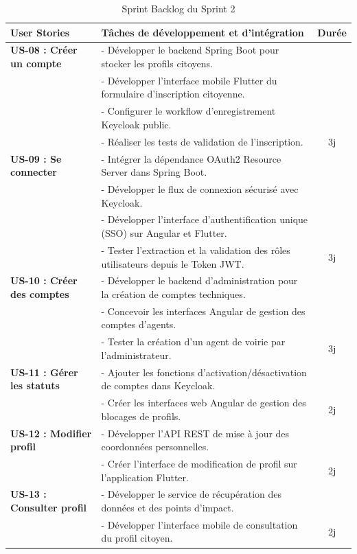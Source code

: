 \begin{table}[H]
    \centering
    \caption{Sprint Backlog du Sprint 2}
    \label{tab:backlog_sprint2}
    \vspace{0.2cm}
    \scriptsize
    \begin{tabularx}{\textwidth}{|l|X|c|}
        \hline
        \textbf{User Stories} & \textbf{Tâches de développement et d'intégration} & \textbf{Durée} \\ \hline
        \textbf{US-08 : Créer un compte} & 
        - Développer le backend Spring Boot pour stocker les profils citoyens.\\
        & - Développer l'interface mobile Flutter du formulaire d'inscription citoyenne.\\
        & - Configurer le workflow d'enregistrement Keycloak public.\\
        & - Réaliser les tests de validation de l'inscription. & 3j \\ \hline
        \textbf{US-09 : Se connecter} &
        - Intégrer la dépendance OAuth2 Resource Server dans Spring Boot.\\
        & - Développer le flux de connexion sécurisé avec Keycloak.\\
        & - Développer l'interface d'authentification unique (SSO) sur Angular et Flutter.\\
        & - Tester l'extraction et la validation des rôles utilisateurs depuis le Token JWT. & 3j \\ \hline
        \textbf{US-10 : Créer des comptes} &
        - Développer le backend d'administration pour la création de comptes techniques.\\
        & - Concevoir les interfaces Angular de gestion des comptes d'agents.\\
        & - Tester la création d'un agent de voirie par l'administrateur. & 3j \\ \hline
        \textbf{US-11 : Gérer les statuts} &
        - Ajouter les fonctions d'activation/désactivation de comptes dans Keycloak.\\
        & - Créer les interfaces web Angular de gestion des blocages de profils. & 2j \\ \hline
        \textbf{US-12 : Modifier profil} &
        - Développer l'API REST de mise à jour des coordonnées personnelles.\\
        & - Créer l'interface de modification de profil sur l'application Flutter. & 2j \\ \hline
        \textbf{US-13 : Consulter profil} &
        - Développer le service de récupération des données et des points d'impact.\\
        & - Développer l'interface mobile de consultation du profil citoyen. & 2j \\ \hline
    \end{tabularx}
\end{table}

